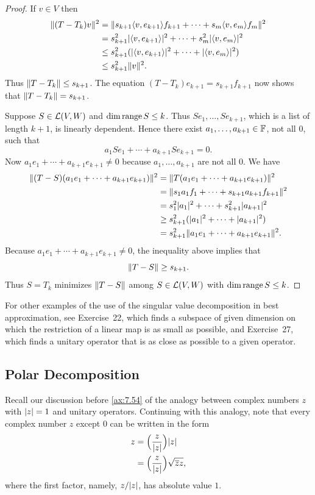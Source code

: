 \begin{proof}
If $v\in V$ then
\begin{align*}
\lVert (T-T_k)v \rVert^2
  &= \lVert s_{k+1}\langle v, e_{k+1} \rangle f_{k+1}+\cdots+s_m\langle v, e_m \rangle f_m \rVert^2\\
  &= s_{k+1}^2\lvert \langle v, e_{k+1} \rangle \rvert^2+\cdots+s_m^2\lvert \langle v, e_m \rangle \rvert^2\\
  &\le s_{k+1}^2(\lvert \langle v, e_{k+1} \rangle \rvert^2+\cdots+\lvert \langle v, e_m \rangle \rvert^2)\\
  &\le s_{k+1}^2\lVert v \rVert^2.
\end{align*}
Thus $\lVert T-T_k \rVert\le s_{k+1}$. The equation $(T-T_k)e_{k+1}=s_{k+1}f_{k+1}$
now shows that $\lVert T-T_k \rVert=s_{k+1}$.

Suppose $S\in\mathcal{L}(V,W)$ and $\operatorname{dim}\operatorname{range} S\le k$. Thus $Se_1,\dots,Se_{k+1}$,
which is a list of length $k+1$, is linearly dependent. Hence there exist
$a_1,\dots,a_{k+1}\in\mathbb{F}$, not all $0$, such that
\[ a_1Se_1+\cdots+a_{k+1}Se_{k+1}=0. \]
Now $a_1e_1+\cdots+a_{k+1}e_{k+1}\ne0$ because $a_1,\dots,a_{k+1}$ are not all
$0$. We have
\begin{align*}
\lVert (T-S)(a_1e_1+\cdots+a_{k+1}e_{k+1}) \rVert^2
  &= \lVert T(a_1e_1+\cdots+a_{k+1}e_{k+1}) \rVert^2\\
  &= \lVert s_1a_1f_1+\cdots+s_{k+1}a_{k+1}f_{k+1} \rVert^2\\
  &= s_1^2\lvert a_1 \rvert^2+\cdots+s_{k+1}^2\lvert a_{k+1} \rvert^2\\
  &\ge s_{k+1}^2(\lvert a_1 \rvert^2+\cdots+\lvert a_{k+1} \rvert^2)\\
  &= s_{k+1}^2\lVert a_1e_1+\cdots+a_{k+1}e_{k+1} \rVert^2.
\end{align*}
Because $a_1e_1+\cdots+a_{k+1}e_{k+1}\ne0$, the inequality above implies that
\[ \lVert T-S \rVert\ge s_{k+1}. \]
Thus $S=T_k$ minimizes $\lVert T-S \rVert$ among $S\in\mathcal{L}(V,W)$ with
$\operatorname{dim}\operatorname{range} S\le k$.
\end{proof}

For other examples of the use of the singular value decomposition in best
approximation, see Exercise~22, which finds a subspace of given dimension on
which the restriction of a linear map is as small as possible, and
Exercise~27, which finds a unitary operator that is as close as possible to a
given operator.

\subsection{Polar Decomposition}

Recall our discussion before \ref{ax:7.54} of the analogy between complex
numbers $z$ with $\lvert z \rvert=1$ and unitary operators. Continuing with this
analogy, note that every complex number $z$ except $0$ can be written in the
form
\begin{align*}
z &= \Bigl(\frac{z}{\lvert z \rvert}\Bigr)\lvert z \rvert\\
  &= \Bigl(\frac{z}{\lvert z \rvert}\Bigr)\sqrt{\overline{z}z},
\end{align*}
where the first factor, namely, $z/\lvert z \rvert$, has absolute value $1$.

